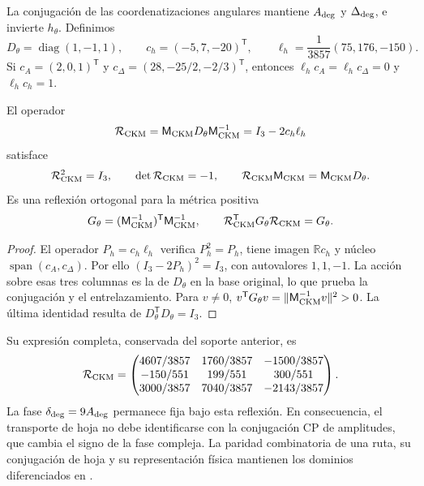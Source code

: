 La conjugación de las coordenatizaciones angulares mantiene \(A_{\rm deg}\) y
\(\Delta_{\rm deg}\), e invierte \(h_\theta\). Definimos
\begin{equation}
 D_\theta=\operatorname{diag}(1,-1,1),\qquad
 c_h=(-5,7,-20)^{\mathsf T},\qquad
 \ell_h=\frac1{3857}(75,176,-150).
 \label{eq:ii-ckm-sheet-data}
\end{equation}
Si \(c_A=(2,0,1)^{\mathsf T}\) y
\(c_\Delta=(28,-25/2,-2/3)^{\mathsf T}\), entonces
\(\ell_hc_A=\ell_hc_\Delta=0\) y \(\ell_hc_h=1\).

\begin{theorem}
El operador
\begin{equation}
 \mathcal R_{\rm CKM}
 =\mathsf M_{\rm CKM}D_\theta\mathsf M_{\rm CKM}^{-1}
 =I_3-2c_h\ell_h
 \label{eq:ii-ckm-reflection}
\end{equation}
satisface
\begin{equation}
 \mathcal R_{\rm CKM}^2=I_3,\qquad
 \det\mathcal R_{\rm CKM}=-1,\qquad
 \mathcal R_{\rm CKM}\mathsf M_{\rm CKM}
 =\mathsf M_{\rm CKM}D_\theta.
 \label{eq:ii-ckm-intertwining}
\end{equation}
Es una reflexión ortogonal para la métrica positiva
\begin{equation}
 G_\theta=(\mathsf M_{\rm CKM}^{-1})^{\mathsf T}
                 \mathsf M_{\rm CKM}^{-1},\qquad
 \mathcal R_{\rm CKM}^{\mathsf T}G_\theta\mathcal R_{\rm CKM}=G_\theta.
 \label{eq:ii-ckm-metric}
\end{equation}
\end{theorem}

\begin{proof}
El operador \(P_h=c_h\ell_h\) verifica \(P_h^2=P_h\), tiene imagen
\(\mathbb Rc_h\) y núcleo \(\operatorname{span}(c_A,c_\Delta)\).
Por ello \((I_3-2P_h)^2=I_3\), con autovalores \(1,1,-1\).
La acción sobre esas tres columnas es la de \(D_\theta\) en la base
original, lo que prueba la conjugación y el entrelazamiento.
Para \(v\ne0\),
\(v^{\mathsf T}G_\theta v=\|\mathsf M_{\rm CKM}^{-1}v\|^2>0\).
La última identidad resulta de \(D_\theta^{\mathsf T}D_\theta=I_3\).
\end{proof}

Su expresión completa, conservada del soporte anterior, es
\begin{equation}
 \mathcal R_{\rm CKM}=
 \begin{pmatrix}
 4607/3857&1760/3857&-1500/3857\\
 -150/551&199/551&300/551\\
 3000/3857&7040/3857&-2143/3857
 \end{pmatrix}.
 \label{eq:ii-ckm-reflection-matrix}
\end{equation}
La fase \(\delta_{\rm deg}=9A_{\rm deg}\) permanece fija bajo esta
reflexión. En consecuencia, el transporte de hoja no debe identificarse
con la conjugación CP de amplitudes, que cambia el signo de la fase compleja.
La paridad combinatoria de una ruta, su conjugación de hoja y su
representación física mantienen los dominios diferenciados en
\cite{cpt,mezcla}.

